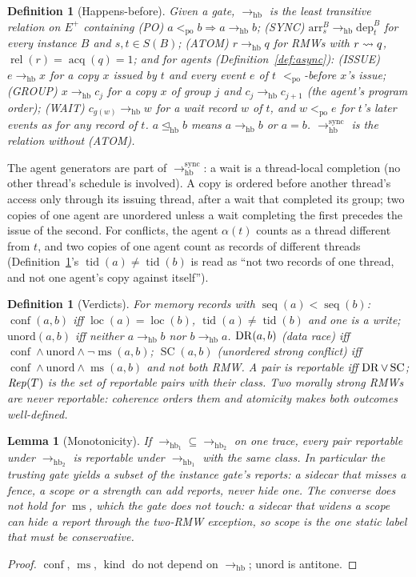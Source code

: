 \documentclass[11pt]{article}
\newtheorem{lemma}[theorem]{Lemma}
\newtheorem{definition}[theorem]{Definition}
\theoremstyle{remark}
\DeclareMathOperator{\tid}{tid}\DeclareMathOperator{\pc}{pc}\DeclareMathOperator{\seq}{seq}
\DeclareMathOperator{\loc}{loc}\DeclareMathOperator{\blk}{blk}\DeclareMathOperator{\kind}{kind}
\DeclareMathOperator{\conf}{conf}\DeclareMathOperator{\ms}{ms}\DeclareMathOperator{\incl}{incl}
\DeclareMathOperator{\rel}{rel}\DeclareMathOperator{\acq}{acq}\DeclareMathOperator{\key}{key}
\DeclareMathOperator{\SC}{SC}
\newcommand{\PO}{<_{\mathrm{po}}}\newcommand{\HB}{\to_{\mathrm{hb}}}\newcommand{\HBr}{\trianglelefteq_{\mathrm{hb}}}
\newcommand{\arr}[2]{\mathrm{arr}^{#2}_{#1}}\newcommand{\dep}[2]{\mathrm{dep}^{#2}_{#1}}\newcommand{\ext}[1]{\mathrm{exit}_{#1}}
\newcommand{\Eplus}{E^{+}}\newcommand{\Fr}{\mathcal{F}}\newcommand{\Pred}{\mathcal{P}}
\begin{document}
\begin{definition}[Happens-before]\label{def:hb}
Given a gate, $\HB$ is the least transitive relation on $\Eplus$ containing
(PO) $a\PO b\Rightarrow a\HB b$;
(SYNC) $\arr{s}{B}\HB\dep{t}{B}$ for every instance $B$ and $s,t\in S(B)$;
(ATOM) $r\HB q$ for RMWs with $r\rightsquigarrow q$, $\rel(r)=\acq(q)=1$;
and for agents (Definition~\ref{def:async}):
(ISSUE) $e\HB x$ for a copy $x$ issued by $t$ and every event $e$ of $t$ $\PO$-before $x$'s
issue;
(GROUP) $x\HB c_j$ for a copy $x$ of group $j$ and $c_j\HB c_{j+1}$ (the agent's program order);
(WAIT) $c_{g(w)}\HB w$ for a wait record $w$ of $t$, and $w\PO e$ for $t$'s later events as for
any record of $t$.
$a\HBr b$ means $a\HB b$ or $a=b$. $\HB^{\mathrm{sync}}$ is the relation without (ATOM).
\end{definition}
The agent generators are part of $\HB^{\mathrm{sync}}$: a wait is a thread-local completion
(no other thread's schedule is involved). A copy is ordered before another thread's access
only through its issuing thread, after a wait that completed its group; two copies of one
agent are unordered unless a wait completing the first precedes the issue of the second.
For conflicts, the agent $\alpha(t)$ counts as a thread different from $t$, and two copies of
one agent count as records of different threads (Definition~\ref{def:verdict}'s
$\tid(a)\ne\tid(b)$ is read as ``not two records of one thread, and not one agent's copy
against itself'').

\begin{definition}[Verdicts]\label{def:verdict}
For memory records with $\seq(a)<\seq(b)$: $\conf(a,b)$ iff $\loc(a)=\loc(b)$,
$\tid(a)\ne\tid(b)$ and one is a write; $\mathrm{unord}(a,b)$ iff neither $a\HB b$ nor
$b\HB a$. $\operatorname{DR}(a,b)$ (data race) iff $\conf\wedge\mathrm{unord}\wedge\neg\ms(a,b)$;
$\SC(a,b)$ (unordered strong conflict) iff $\conf\wedge\mathrm{unord}\wedge\ms(a,b)$ and
not both RMW. A pair is \emph{reportable} iff $\DR\vee\SC$; $\mathit{Rep}(T)$ is the set of
reportable pairs with their class. Two morally strong RMWs are never reportable:
coherence orders them and atomicity makes both outcomes well-defined.
\end{definition}

\begin{lemma}[Monotonicity]\label{lem:mono}
If $\mathrel{\to_{\mathrm{hb}_1}}\subseteq\mathrel{\to_{\mathrm{hb}_2}}$ on one trace, every pair reportable under $\to_{\mathrm{hb}_2}$ is
reportable under $\to_{\mathrm{hb}_1}$ with the same class. In particular the trusting gate yields a
subset of the instance gate's reports: a sidecar that misses a fence, a scope or a strength
can add reports, never hide one. The converse does not hold for $\ms$, which the gate does
not touch: a sidecar that \emph{widens} a scope can hide a report through the two-RMW
exception, so scope is the one static label that must be conservative.
\end{lemma}
\begin{proof}
$\conf$, $\ms$, $\kind$ do not depend on $\HB$; unord is antitone.
\end{proof}
\end{document}
